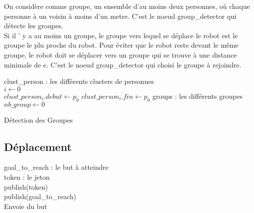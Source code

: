 \documentclass{article}
\begin{document}
On consid\`ere comme groupe, un ensemble d'au moins deux personnes, o\`u chaque
personne \`a un voisin \`a moins d'un metre. C'est le noeud group\_detector qui
d\'etecte les groupes.\\
Si il ' y a au moins un groupe, le groupe vers lequel se d\'eplace le robot est
le groupe le plu proche du robot. Pour \'eviter que le robot reste devant le
m\^eme groupe, le robot doit se d\'eplacer vers un groupe qui se trouve \`a une
distance minimale de e. C'est le noeud group\_detector qui choisi le
groupe \`a rejoindre.


\begin{algorithm}[H]
  clust\_person : les diff\'erents clusters de personnes \\
  $i\gets0$ \\
  $clust\_person_i.debut \gets p_0$
  $clust\_person_i.fin \gets p_0$
  groups : les diff\'erents groupes \\
  $nb\_group \gets 0$ \\
  \caption{D\'etection des Groupes}
\end{algorithm}

\subsection{D\'eplacement}

\begin{algorithm}[H]
  goal\_to\_reach : le but \`a atteindre \\
  token : le jeton \\
  publish(token)\\
  publish(goal\_to\_reach)\\
  \caption{Envoie du but}
\end{algorithm}
\end{document}
